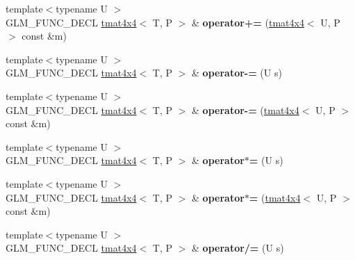 \begin{DoxyCompactItemize}
\item 
\hypertarget{structglm_1_1detail_1_1tmat4x4_a4b67c9c0f2f7eca42f6d41a5f91fcdf5}{{\footnotesize template$<$typename U $>$ }\\G\-L\-M\-\_\-\-F\-U\-N\-C\-\_\-\-D\-E\-C\-L \hyperlink{structglm_1_1detail_1_1tmat4x4}{tmat4x4}$<$ T, P $>$ \& {\bfseries operator+=} (\hyperlink{structglm_1_1detail_1_1tmat4x4}{tmat4x4}$<$ U, P $>$ const \&m)}\label{structglm_1_1detail_1_1tmat4x4_a4b67c9c0f2f7eca42f6d41a5f91fcdf5}

\item 
\hypertarget{structglm_1_1detail_1_1tmat4x4_acfc4f485eb7cd93ed168d924582e89ba}{{\footnotesize template$<$typename U $>$ }\\G\-L\-M\-\_\-\-F\-U\-N\-C\-\_\-\-D\-E\-C\-L \hyperlink{structglm_1_1detail_1_1tmat4x4}{tmat4x4}$<$ T, P $>$ \& {\bfseries operator-\/=} (U s)}\label{structglm_1_1detail_1_1tmat4x4_acfc4f485eb7cd93ed168d924582e89ba}

\item 
\hypertarget{structglm_1_1detail_1_1tmat4x4_a47a07eac46c9ed5021446e40bbfb8d8e}{{\footnotesize template$<$typename U $>$ }\\G\-L\-M\-\_\-\-F\-U\-N\-C\-\_\-\-D\-E\-C\-L \hyperlink{structglm_1_1detail_1_1tmat4x4}{tmat4x4}$<$ T, P $>$ \& {\bfseries operator-\/=} (\hyperlink{structglm_1_1detail_1_1tmat4x4}{tmat4x4}$<$ U, P $>$ const \&m)}\label{structglm_1_1detail_1_1tmat4x4_a47a07eac46c9ed5021446e40bbfb8d8e}

\item 
\hypertarget{structglm_1_1detail_1_1tmat4x4_a5f45264cb14dad1d45f52b8dc4c21182}{{\footnotesize template$<$typename U $>$ }\\G\-L\-M\-\_\-\-F\-U\-N\-C\-\_\-\-D\-E\-C\-L \hyperlink{structglm_1_1detail_1_1tmat4x4}{tmat4x4}$<$ T, P $>$ \& {\bfseries operator$\ast$=} (U s)}\label{structglm_1_1detail_1_1tmat4x4_a5f45264cb14dad1d45f52b8dc4c21182}

\item 
\hypertarget{structglm_1_1detail_1_1tmat4x4_a7f776dccae9e5f84df52c4118986f3f9}{{\footnotesize template$<$typename U $>$ }\\G\-L\-M\-\_\-\-F\-U\-N\-C\-\_\-\-D\-E\-C\-L \hyperlink{structglm_1_1detail_1_1tmat4x4}{tmat4x4}$<$ T, P $>$ \& {\bfseries operator$\ast$=} (\hyperlink{structglm_1_1detail_1_1tmat4x4}{tmat4x4}$<$ U, P $>$ const \&m)}\label{structglm_1_1detail_1_1tmat4x4_a7f776dccae9e5f84df52c4118986f3f9}

\item 
\hypertarget{structglm_1_1detail_1_1tmat4x4_a416de4c3606f70b3472286159d73454a}{{\footnotesize template$<$typename U $>$ }\\G\-L\-M\-\_\-\-F\-U\-N\-C\-\_\-\-D\-E\-C\-L \hyperlink{structglm_1_1detail_1_1tmat4x4}{tmat4x4}$<$ T, P $>$ \& {\bfseries operator/=} (U s)}\label{structglm_1_1detail_1_1tmat4x4_a416de4c3606f70b3472286159d73454a}


\end{DoxyCompactItemize}
